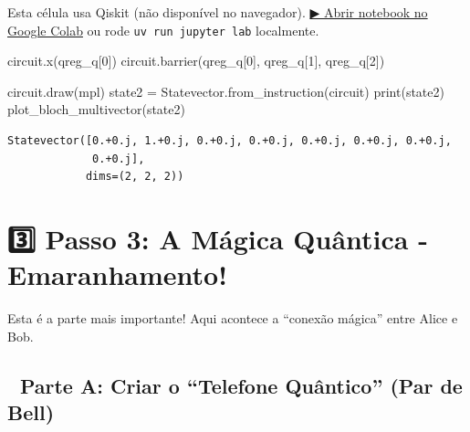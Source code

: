 \documentclass[
  brazilian,
]{report}
\newenvironment{Shaded}{\begin{snugshade}}{\end{snugshade}}
\newcommand{\BuiltInTok}[1]{\textcolor[rgb]{0.00,0.23,0.31}{#1}}
\newcommand{\DecValTok}[1]{\textcolor[rgb]{0.68,0.00,0.00}{#1}}
\newcommand{\NormalTok}[1]{\textcolor[rgb]{0.00,0.23,0.31}{#1}}
\newcommand{\OperatorTok}[1]{\textcolor[rgb]{0.37,0.37,0.37}{#1}}
\newcommand{\StringTok}[1]{\textcolor[rgb]{0.13,0.47,0.30}{#1}}
\begin{document}
\begin{tcolorbox}[enhanced jigsaw, arc=.35mm, bottomrule=.15mm, bottomtitle=1mm, breakable, colback=white, colbacktitle=quarto-callout-warning-color!10!white, colframe=quarto-callout-warning-color-frame, coltitle=black, left=2mm, leftrule=.75mm, opacityback=0, opacitybacktitle=0.6, rightrule=.15mm, title=\textcolor{quarto-callout-warning-color}{\faExclamationTriangle}\hspace{0.5em}{⚛️ Célula Qiskit --- execute no Colab ou localmente}, titlerule=0mm, toprule=.15mm, toptitle=1mm]

Esta célula usa Qiskit (não disponível no navegador).
\href{https://colab.research.google.com/github/maxwellamaral/aula-quantum/blob/main/notebooks/02-teletransport.ipynb}{▶
Abrir notebook no Google Colab} ou rode \texttt{uv\ run\ jupyter\ lab}
localmente.

\begin{Shaded}
\begin{Highlighting}[]


\NormalTok{circuit.x(qreg\_q[}\DecValTok{0}\NormalTok{])}
\NormalTok{circuit.barrier(qreg\_q[}\DecValTok{0}\NormalTok{], qreg\_q[}\DecValTok{1}\NormalTok{], qreg\_q[}\DecValTok{2}\NormalTok{])}

\NormalTok{circuit.draw(}\StringTok{\textquotesingle{}mpl\textquotesingle{}}\NormalTok{)}
\NormalTok{state2 }\OperatorTok{=}\NormalTok{ Statevector.from\_instruction(circuit)}
\BuiltInTok{print}\NormalTok{(state2)}
\NormalTok{plot\_bloch\_multivector(state2)}
\end{Highlighting}
\end{Shaded}

\end{tcolorbox}

\begin{verbatim}
Statevector([0.+0.j, 1.+0.j, 0.+0.j, 0.+0.j, 0.+0.j, 0.+0.j, 0.+0.j,
             0.+0.j],
            dims=(2, 2, 2))
\end{verbatim}

\section{3️⃣ Passo 3: A Mágica Quântica -
Emaranhamento!}\label{passo-3-a-muxe1gica-quuxe2ntica---emaranhamento}

Esta é a parte mais importante! Aqui acontece a ``conexão mágica'' entre
Alice e Bob.

\subsection{🔗 Parte A: Criar o ``Telefone Quântico'' (Par de
Bell)}\label{parte-a-criar-o-telefone-quuxe2ntico-par-de-bell}
\end{document}
